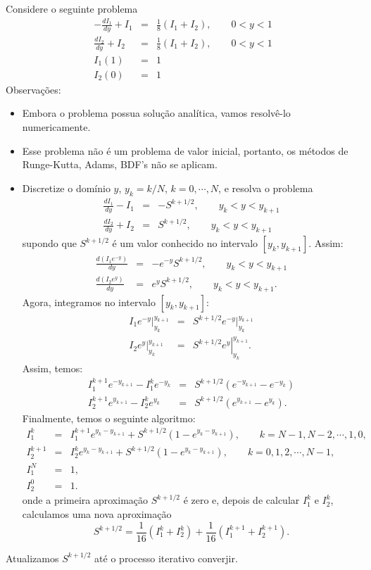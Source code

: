 \begin{exer}\label{transp_1}
 Considere o seguinte problema
\begin{eqnarray*}
-\frac{dI_1}{dy}+I_1&=&\frac{1}{8}\left(I_1+I_2\right),\qquad 0<y<1\\
\frac{dI_2}{dy}+ I_2&=&\frac{1}{8}\left(I_1+I_2\right),\qquad 0<y<1\\
I_1(1)&=&1\\
I_2(0)&=&1
\end{eqnarray*}
Observações:
\begin{itemize}
 \item Embora o problema possua solução analítica, vamos resolvê-lo numericamente.
 \item Esse problema não é um problema de valor inicial, portanto, os métodos de Runge-Kutta, Adams, BDF's não se aplicam.
 \item Discretize o domínio $y$, $y_k=k/N$, $k=0,\cdots,N$, e resolva o problema
\begin{eqnarray*}
\frac{dI_1}{dy}-I_1&=&-S^{k+1/2},\qquad y_k<y<y_{k+1}\\
\frac{dI_2}{dy}+ I_2&=&S^{k+1/2},\qquad y_k<y<y_{k+1}
\end{eqnarray*}
supondo que $S^{k+1/2}$ é um valor conhecido no intervalo $[y_k,y_{k+1}]$. Assim:
\begin{eqnarray*}
\frac{d (I_1e^{-y})}{dy}&=&-e^{-y}S^{k+1/2},\qquad y_k<y<y_{k+1}\\
\frac{d(I_2e^y)}{dy}&=&e^yS^{k+1/2},\qquad y_k<y<y_{k+1}.
\end{eqnarray*}
Agora, integramos no intervalo $[y_k,y_{k+1}]$:
\begin{eqnarray*}
 \left.I_1e^{-y}\right|_{y_{k}}^{y_{k+1}}&=&S^{k+1/2}\left.e^{-y}\right|_{y_{k}}^{y_{k+1}}\\
\left.I_2e^y\right|_{y_{k}}^{y_{k+1}}&=&\left.S^{k+1/2}e^y\right|_{y_{k}}^{y_{k+1}}.
\end{eqnarray*}
Assim, temos:
\begin{eqnarray*}
 I_1^{k+1}e^{-y_{k+1}}-I_1^{k}e^{-y_{k}}&=&S^{k+1/2}\left(e^{-y_{k+1}}-e^{-y_{k}}\right)\\
 I_2^{k+1}e^{y_{k+1}}-I_2^{k}e^{y_{k}}&=&S^{k+1/2}\left(e^{y_{k+1}}-e^{y_{k}}\right).
\end{eqnarray*}
Finalmente, temos o seguinte algoritmo:
\begin{eqnarray*}
 I_1^{k}&=&I_1^{k+1}e^{y_{k}-y_{k+1}}+S^{k+1/2}\left(1-e^{y_k-y_{k+1}}\right),\qquad k=N-1,N-2,\cdots ,1,0,\\
 I_2^{k+1}&=&I_2^{k}e^{y_{k}-y_{k+1}}+S^{k+1/2}\left(1-e^{y_{k}-y_{k+1}}\right), \qquad k=0,1,2,\cdots,N-1,\\
 I_1^N&=&1,\\
 I_2^0&=&1.
\end{eqnarray*}
onde a primeira aproximação $S^{k+1/2}$ é zero e, depois de calcular $I_1^k$ e $I_2^k$, calculamos uma nova aproximação
$$
S^{k+1/2}=\frac{1}{16}\left(I_1^k+I_2^k\right)+\frac{1}{16}\left(I_1^{k+1}+I_2^{k+1}\right).
$$
\end{itemize}
Atualizamos $S^{k+1/2}$ até o processo iterativo converjir.
\end{exer}

